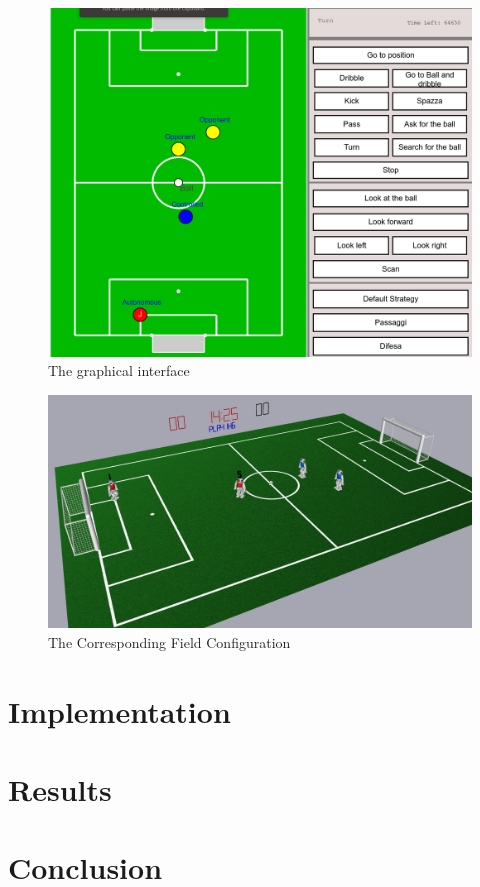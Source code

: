 \documentclass[a4paper, onecolumn, 12pt]{article}
\begin{document}
\begin{figure}[H]
    \centering
    \includegraphics[width=0.9\linewidth]{assets/interface.png}
    \caption{The graphical interface}
    \label{fig:interface}
\end{figure}

\begin{figure}[H]
    \centering
    \includegraphics[width=0.9\linewidth]{assets/simrobot.png}
    \caption{The Corresponding Field Configuration}
    \label{fig:nao}
\end{figure}

\section{Implementation}
\label{sec:impl}


\section{Results}
\label{sec:res}


\section{Conclusion}
\label{sec:con}




\end{document}
